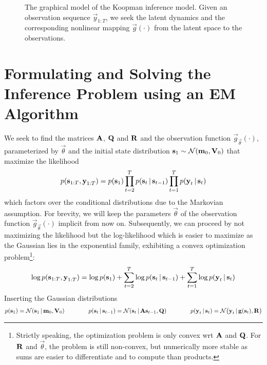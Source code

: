 \begin{figure}
	\centering
	\tikzNonlinearGaussianKoopman
	\caption{The graphical model of the Koopman inference model. Given an observation sequence \( \vec{y}_{1:T} \), we seek the latent dynamics and the corresponding nonlinear mapping \( \vec{g}(\cdot) \) from the latent space to the observations.}
	\label{fig:nonlinearGaussianKoopman}
\end{figure}

\section{Formulating and Solving the Inference Problem using an EM Algorithm}
	\label{sec:ngkDerivation}

	We seek to find the matrices \(\boldsymbol{\mathrm{A}}\), \(\boldsymbol{\mathrm{Q}}\) and \(\boldsymbol{\mathrm{R}}\) and the observation function \( \vec{g}_{\vec{\theta}}(\cdot) \), parameterized by \(\vec{\theta}\) and the initial state distribution \( \boldsymbol{\mathrm{s}}_1 \sim \mathcal{N}(\boldsymbol{\mathrm{m}}_0, \boldsymbol{\mathrm{V}}_0) \) that maximize the likelihood
	\begin{equation*}
		p(\boldsymbol{\mathrm{s}}_{1:T}, \boldsymbol{\mathrm{y}}_{1:T}) = p(\boldsymbol{\mathrm{s}}_1) \prod_{t = 2}^{T} p(\boldsymbol{\mathrm{s}}_t \,\vert\, \boldsymbol{\mathrm{s}}_{t - 1}) \prod_{t = 1}^{T} p(\boldsymbol{\mathrm{y}}_t \,\vert\, \boldsymbol{\mathrm{s}}_t)
	\end{equation*}
	which factors over the conditional distributions due to the Markovian assumption. For brevity, we will keep the parameters \( \vec{\theta} \) of the observation function \( \vec{g}_{\vec{\theta}}(\cdot) \) implicit from now on. Subsequently, we can proceed by not maximizing the likelihood but the log-likelihood which is easier to maximize as the Gaussian lies in the exponential family, exhibiting a convex optimization problem\footnote{Strictly speaking, the optimization problem is only convex \ac{wrt} \(\boldsymbol{\mathrm{A}}\) and \(\boldsymbol{\mathrm{Q}}\). For \(\boldsymbol{\mathrm{R}}\) and \(\vec{\theta}\), the problem is still non-convex, but numerically more stable as sums are easier to differentiate and to compute than products.}:
	\begin{equation*}
		\log p(\boldsymbol{\mathrm{s}}_{1:T}, \boldsymbol{\mathrm{y}}_{1:T}) = \log p(\boldsymbol{\mathrm{s}}_1) + \sum_{t = 2}^{T} \log p(\boldsymbol{\mathrm{s}}_t \,\vert\, \boldsymbol{\mathrm{s}}_{t - 1}) + \sum_{t = 1}^{T} \log p(\boldsymbol{\mathrm{y}}_t \,\vert\, \boldsymbol{\mathrm{s}}_t)
	\end{equation*}
	Inserting the Gaussian distributions
	\begin{equation*}
		p(\boldsymbol{\mathrm{s}}_1) = \mathcal{N}(\boldsymbol{\mathrm{s}}_1 \,\vert\, \boldsymbol{\mathrm{m}}_0, \boldsymbol{\mathrm{V}}_0) \qquad\qquad
		p(\boldsymbol{\mathrm{s}}_t \,\vert\, \boldsymbol{\mathrm{s}}_{t - 1}) = \mathcal{N}(\boldsymbol{\mathrm{s}}_t \,\vert\, \boldsymbol{\mathrm{A}} \boldsymbol{\mathrm{s}}_{t - 1}, \boldsymbol{\mathrm{Q}}) \qquad\qquad
		p(\boldsymbol{\mathrm{y}}_t \,\vert\, \boldsymbol{\mathrm{s}}_t) = \mathcal{N}\big(\boldsymbol{\mathrm{y}}_t \,\vert\, \boldsymbol{\mathrm{g}}(\boldsymbol{\mathrm{s}}_t), \boldsymbol{\mathrm{R}}\big)
	\end{equation*}
